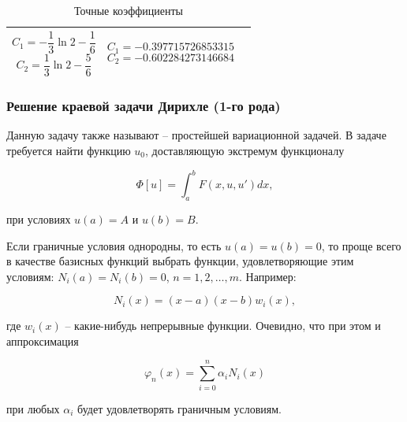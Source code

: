 \documentclass{article}
\begin{document}
\begin{table}[!h]
\begin{tabular}{|c|c|c|}
	\parbox[c]{3cm}{
		 \begin{displaymath}
			 C_{1} = - \frac{1}{3} \ln{2} - \frac{1}{6} 
		 \end{displaymath}
		\begin{displaymath} 	
			 C_{2} = \frac{1}{3} \ln{2} - \frac{5}{6}
		 \end{displaymath}
		 } & 
		 
	\parbox[c]{4.07cm}{
		 \begin{displaymath}
			 C_{1} = -0.397715726853315
		 \end{displaymath}
		 \begin{displaymath}
			 C_{2} = -0.602284273146684
		 \end{displaymath}
		 }\\	\hline
	\end{tabular}
	\caption{Точные коэффициенты}
	\label{table_exact_coefficients}
\end{table}

\subsubsection{Решение краевой задачи Дирихле (1-го рода)}

Данную задачу также называют – простейшей вариационной задачей. В задаче требуется найти функцию $u_{0}$, доставляющую экстремум функционалу

\begin{displaymath}
	\Phi[u] = \int_{a}^{b} F(x, u, u')dx,
\end{displaymath}

\noindent при условиях $u(a) = A$ и $u(b) = B$.

Если граничные условия однородны, то есть $u(a) = u(b) = 0$, то проще всего в качестве базисных функций выбрать функции, удовлетворяющие этим условиям: $N_{i}(a) = N_{i}(b) = 0$, $n = 1, 2, \ldots, m$. Например:

\begin{displaymath}
	N_{i}(x) = (x-a)(x-b)w_{i}(x),
\end{displaymath}

\noindent где $w_{i}(x)$ – какие-нибудь непрерывные функции. Очевидно, что при этом и аппроксимация 

\begin{displaymath}
	\varphi_{n}(x) = \sum_{i=0}^n \alpha_{i}N_{i}(x)
\end{displaymath}

\noindent при любых $\alpha_{i}$ будет удовлетворять граничным условиям.
\end{document}

